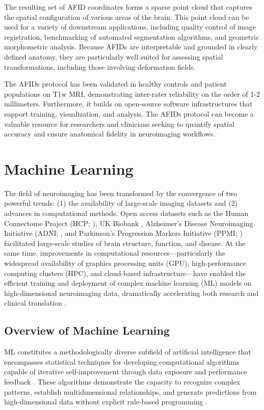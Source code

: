 The resulting set of AFID coordinates forms a sparse point cloud that captures the spatial configuration of various areas of the brain. This point cloud can be used for a variety of downstream applications, including quality control of image registration, benchmarking of automated segmentation algorithms, and geometric morphometric analysis. Because AFIDs are interpretable and grounded in clearly defined anatomy, they are particularly well suited for assessing spatial transformations, including those involving deformation fields.

The AFIDs protocol has been validated in healthy controls and patient populations on T1w MRI, demonstrating inter-rater reliability on the order of 1-2 millimeters. Furthermore, it builds on open-source software infrastructures that support training, visualization, and analysis. The AFIDs protocol can become a valuable resource for researchers and clinicians seeking to quantify spatial accuracy and ensure anatomical fidelity in neuroimaging workflows.

\section{Machine Learning}
The field of neuroimaging has been transformed by the convergence of two powerful trends: (1) the availability of large-scale imaging datasets and (2) advances in computational methods. Open access datasets such as the Human Connectome Project (HCP; \cite{Van_Essen2013-yi}), UK Biobank \cite{Sudlow2015-lq}, Alzheimer's Disease Neuroimaging Initiative (ADNI; \cite{Petersen2010-rd}, and Parkinson's Progression Markers Initiative (PPMI; \cite{Marek2018-wx}) facilitated large-scale studies of brain structure, function, and disease. At the same time, improvements in computational resources—particularly the widespread availability of graphics processing units (GPU), high-performance computing clusters (HPC), and cloud-based infrastructure—have enabled the efficient training and deployment of complex machine learning (ML) models on high-dimensional neuroimaging data, dramatically accelerating both research and clinical translation \cite{Bouchard2016-cd,Kirimtat2024-is}.

\subsection{Overview of Machine Learning}
ML constitutes a methodologically diverse subfield of artificial intelligence that encompasses statistical techniques for developing computational algorithms capable of iterative self-improvement through data exposure and performance feedback \cite{Sarker2021-ng}. These algorithms demonstrate the capacity to recognize complex patterns, establish multidimensional relationships, and generate predictions from high-dimensional data without explicit rule-based programming \cite{Davatzikos2019-zq}.

